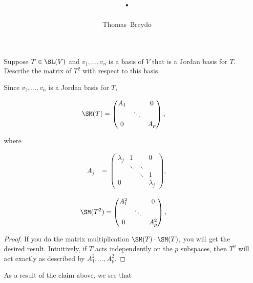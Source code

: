 \documentclass{amsart}
\title{\pagenum.\probnum}
\author{Thomas\ Breydo}
\begin{document}
\maketitle

\begin{problem*}
Suppose $T\in\SL(V)$ and $v_1,\dots,v_n$ is a basis of $V$
that is a Jordan basis for $T.$ Describe the matrix
of $T^2$ with respect to this basis.
\end{problem*}

\vspace{0.5in}

Since $v_1,\dots,v_n$ is a Jordan basis for $T,$

\begin{align*}
    \SM(T) &= \begin{pmatrix}
        A_1 & & 0 \\
            & \ddots & \\
        0 & & A_p
    \end{pmatrix},
\end{align*}

where

\begin{align*}
    A_j &= \begin{pmatrix}
        \lambda_j & 1 & & 0 \\
                  & \ddots & \ddots & \\
                  &       & \ddots & 1 \\
        0 & & & \lambda_j
    \end{pmatrix},
\end{align*}

\begin{claim*}
    \begin{align*}
    \SM(T^2) &= \begin{pmatrix}
        A_1^2 & & 0 \\
            & \ddots & \\
        0 & & A_p^2
    \end{pmatrix},
    \end{align*}
\end{claim*}
\begin{proof}
If you do the matrix multiplication $\SM(T)\cdot\SM(T),$ you will get
the desired result. Intuitively, if $T$ acts independently on
the $p$ subspaces, then $T^2$ will act exactly as described by
$A_1^2,\dots,A_p^2.$
\end{proof}


As a result of the claim above, we see that
\end{document}
